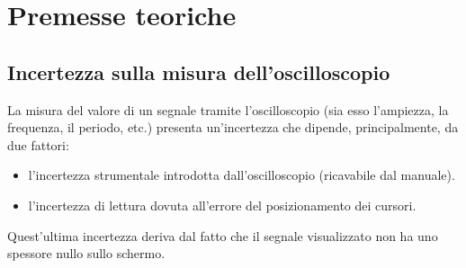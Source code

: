 \documentclass[a4paper]{article}
\begin{document}
	\section{Premesse teoriche}
		\subsection{Incertezza sulla misura dell'oscilloscopio}
			La misura del valore di un segnale tramite l’oscilloscopio (sia esso l'ampiezza, la frequenza, il periodo, etc.) presenta un'incertezza che dipende, principalmente, da due fattori:
			\begin{itemize}
				\item l’incertezza strumentale introdotta dall’oscilloscopio (ricavabile dal manuale).
				\item l’incertezza di lettura dovuta all’errore del posizionamento dei cursori.
			\end{itemize}
			Quest’ultima incertezza deriva dal fatto che il segnale visualizzato non ha uno spessore nullo sullo schermo.
\end{document}
